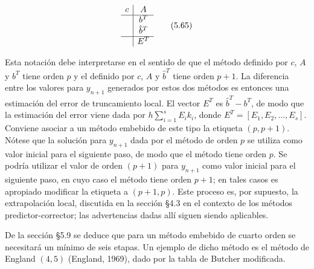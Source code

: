 \begin{equation}
\begin{array}{c|c}
c & A \\
\hline
& b^T \\
& \hat{b}^T \\
\hline
& E^T
\end{array}
\tag{5.65}
\end{equation}

Esta notación debe interpretarse en el sentido de que el método definido por $c$, $A$ y $b^T$ tiene orden $p$ y el definido por $c$, $A$ y $\hat{b}^T$ tiene orden $p+1$. La diferencia entre los valores para $y_{n+1}$ generados por estos dos métodos es entonces una estimación del error de truncamiento local. El vector $E^T$ es $\hat{b}^T - b^T$, de modo que la estimación del error viene dada por $h \sum_{i=1}^{s} E_i k_i$, donde $E^T = [E_1, E_2, \dots, E_s]$. Conviene asociar a un método embebido de este tipo la etiqueta $(p, p + 1)$. Nótese que la solución para $y_{n+1}$ dada por el método de orden $p$ se utiliza como valor inicial para el siguiente paso, de modo que el método tiene orden $p$. Se podría utilizar el valor de orden $(p + 1)$ para $y_{n+1}$ como valor inicial para el siguiente paso, en cuyo caso el método tiene orden $p + 1$; en tales casos es apropiado modificar la etiqueta a $(p + 1, p)$. Este proceso es, por supuesto, la extrapolación local, discutida en la sección §4.3 en el contexto de los métodos predictor-corrector; las advertencias dadas allí siguen siendo aplicables.

De la sección §5.9 se deduce que para un método embebido de cuarto orden se necesitará un mínimo de seis etapas. Un ejemplo de dicho método es el método de England $(4, 5)$ (England, 1969), dado por la tabla de Butcher modificada.

